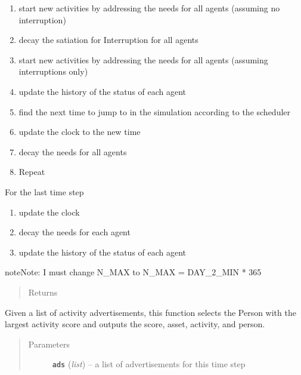 \documentclass[letterpaper,10pt,english]{sphinxmanual}
\begin{document}
\begin{fulllineitems}
\begin{fulllineitems}
\begin{enumerate}
\item {} 
start new activities by addressing the needs for all agents (assuming no interruption)

\item {} 
decay the satiation for Interruption for all agents

\item {} 
start new activities by addressing the needs for all agents (assuming interruptions only)

\item {} 
update the history of the status of each agent

\item {} 
find the next time to jump to in the simulation according to the scheduler

\item {} 
update the clock to the new time

\item {} 
decay the needs for all agents

\item {} 
Repeat

\end{enumerate}

For the last time step
\begin{enumerate}
\item {} 
update the clock

\item {} 
decay the needs for each agent

\item {} 
update the history of the status of each agent

\end{enumerate}

\begin{notice}{note}{Note:}
I must change N\_MAX to N\_MAX = DAY\_2\_MIN * 365
\end{notice}
\begin{quote}\begin{description}
\item[{Returns}] \leavevmode


\end{description}\end{quote}

\end{fulllineitems}


\begin{fulllineitems}
\label{universe:universe.Universe.select_activity}
Given a list of activity advertisements, this function selects the Person
with the largest activity score and outputs the score, asset, activity, and person.
\begin{quote}\begin{description}
\item[{Parameters}] \leavevmode
\textbf{\texttt{ads}} (\emph{list}) -- a list of advertisements for this time step


\end{description}
\end{quote}
\end{fulllineitems}
\end{fulllineitems}
\end{document}
